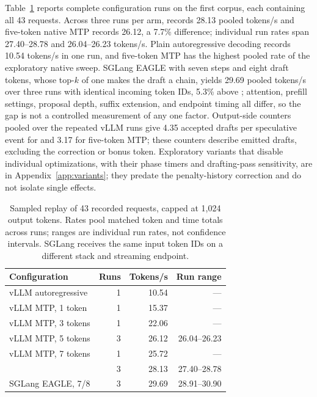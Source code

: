 Table~\ref{tab:request-replay} reports complete configuration runs on the first corpus, each containing all 43 requests. Across three runs per arm, \sys{} records 28.13 pooled tokens/s and five-token native MTP records 26.12, a 7.7\% difference; individual run rates span 27.40--28.78 and 26.04--26.23 tokens/s. Plain autoregressive decoding records 10.54 tokens/s in one run, and five-token MTP has the highest pooled rate of the exploratory native sweep. SGLang EAGLE with seven steps and eight draft tokens, whose top-$k$ of one makes the draft a chain, yields 29.69 pooled tokens/s over three runs with identical incoming token IDs, 5.3\% above \sys{}; attention, prefill settings, proposal depth, suffix extension, and endpoint timing all differ, so the gap is not a controlled measurement of any one factor. Output-side counters pooled over the repeated vLLM runs give 4.35 accepted drafts per speculative event for \sys{} and 3.17 for five-token MTP; these counters describe emitted drafts, excluding the correction or bonus token. Exploratory variants that disable individual \sys{} optimizations, with their phase timers and drafting-pass sensitivity, are in Appendix~\ref{app:variants}; they predate the penalty-history correction and do not isolate single effects.

\begin{table}[t]
\caption{Sampled replay of 43 recorded requests, capped at 1,024 output tokens. Rates pool matched token and time totals across runs; ranges are individual run rates, not confidence intervals. SGLang receives the same input token IDs on a different stack and streaming endpoint.}
\label{tab:request-replay}
\centering\small
\begin{tabular}{@{}lrrr@{}}
\toprule
Configuration & Runs & Tokens/s & Run range \\
\midrule
vLLM autoregressive & 1 & 10.54 & --- \\
vLLM MTP, 1 token & 1 & 15.37 & --- \\
vLLM MTP, 3 tokens & 1 & 22.06 & --- \\
vLLM MTP, 5 tokens & 3 & 26.12 & 26.04--26.23 \\
vLLM MTP, 7 tokens & 1 & 25.72 & --- \\
\sys{} & 3 & 28.13 & 27.40--28.78 \\
\midrule
SGLang EAGLE, 7/8 & 3 & 29.69 & 28.91--30.90 \\
\bottomrule
\end{tabular}
\end{table}

